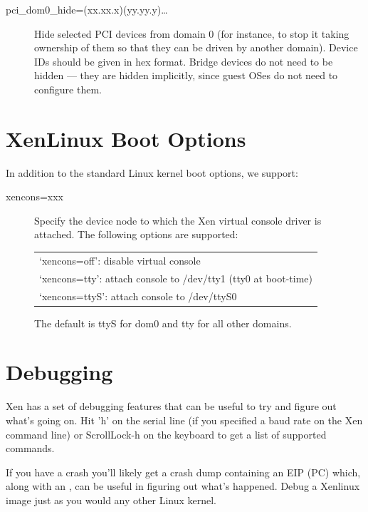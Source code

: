 \documentclass[11pt,twoside,final,openright]{report}
\begin{document}
{\begin{description}
\item [pci\_dom0\_hide=(xx.xx.x)(yy.yy.y)\ldots ] 
Hide selected PCI devices from domain 0 (for instance, to stop it
taking ownership of them so that they can be driven by another
domain).  Device IDs should be given in hex format.  Bridge devices do
not need to be hidden --- they are hidden implicitly, since guest OSes
do not need to configure them.
\end{description} 



\section{XenLinux Boot Options}

In addition to the standard Linux kernel boot options, we support: 
\begin{description} 
\item[xencons=xxx ] Specify the device node to which the Xen virtual
console driver is attached. The following options are supported:
\begin{center}
\begin{tabular}{l}
`xencons=off': disable virtual console \\ 
`xencons=tty': attach console to /dev/tty1 (tty0 at boot-time) \\
`xencons=ttyS': attach console to /dev/ttyS0
\end{tabular}
\end{center}
The default is ttyS for dom0 and tty for all other domains.
\end{description} 



\section{Debugging}
\label{s:keys} 

Xen has a set of debugging features that can be useful to try and
figure out what's going on. Hit 'h' on the serial line (if you
specified a baud rate on the Xen command line) or ScrollLock-h on the
keyboard to get a list of supported commands.

If you have a crash you'll likely get a crash dump containing an EIP
(PC) which, along with an , can be useful in
figuring out what's happened.  Debug a Xenlinux image just as you
would any other Linux kernel.





}
\end{document}
